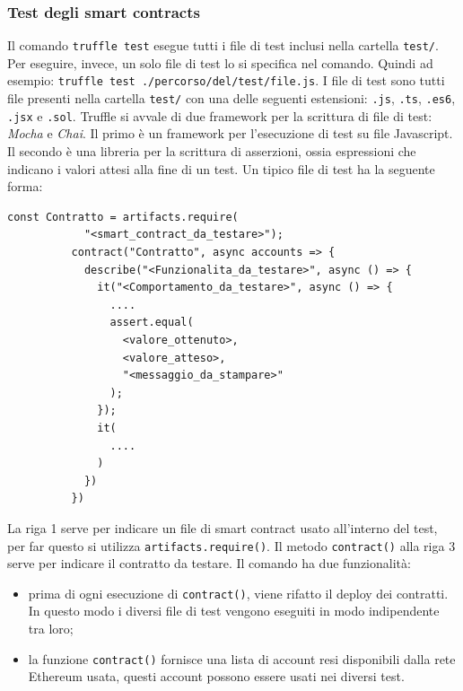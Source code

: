 \documentclass[a4paper]{article}
\begin{document}
        \subsubsection{Test degli smart contracts}
        Il comando \verb|truffle test| esegue tutti i file di test inclusi nella cartella \verb|test/|. Per eseguire, invece, un solo file di test lo si specifica nel comando. Quindi ad esempio: \verb|truffle test ./percorso/del/test/file.js|.
        I file di test sono tutti file presenti nella cartella \verb|test/| con una delle seguenti estensioni: \verb|.js|, \verb|.ts|, \verb|.es6|, \verb|.jsx| e \verb|.sol|.
        \newline
        Truffle si avvale di due framework per la scrittura di file di test: \emph{Mocha} e \emph{Chai}\cite{truffleframeworks}. Il primo è un framework per l'esecuzione di test su file Javascript. Il secondo è una libreria per la scrittura di asserzioni,
        ossia espressioni che indicano i valori attesi alla fine di un test.
        \newline
        Un tipico file di test ha la seguente forma:
        \begin{lstlisting}[style=ES6, title={Esempio di file di test}]
          const Contratto = artifacts.require(
            "<smart_contract_da_testare>");
          contract("Contratto", async accounts => {
            describe("<Funzionalita_da_testare>", async () => {
              it("<Comportamento_da_testare>", async () => {
                ....
                assert.equal(
                  <valore_ottenuto>,
                  <valore_atteso>,
                  "<messaggio_da_stampare>"
                );
              });
              it(
                ....
              )
            })
          })\end{lstlisting}
        La riga 1 serve per indicare un file di smart contract usato all'interno del test, per far questo si utilizza \verb|artifacts.require()|.
        Il metodo \verb|contract()| alla riga 3 serve per indicare il contratto da testare. Il comando ha due funzionalità:
        \begin{itemize}
          \item prima di ogni esecuzione di \verb|contract()|, viene rifatto il deploy dei contratti. In questo modo i diversi file di test vengono eseguiti in modo indipendente tra loro;
          \item la funzione \verb|contract()| fornisce una lista di account resi disponibili dalla rete Ethereum usata, questi account possono essere usati nei diversi test.
        \end{itemize}
\end{document}
